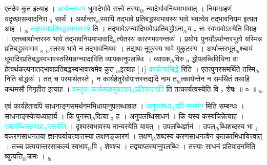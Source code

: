 \documentclass[article,12pt,a4paper]{memoir}%
\newcommand{\quotelemma}[1]{\textcolor{cyan}{#1}}
\newcounter{parCount}
\begin{document}
	  
	  \pstart \leavevmode%
	\hphantom{.}एतदेव कुत इत्याह । \quotelemma{अर्थान्तरस्य} \cite[2a7]{vn-msN} धूमादेर्भावे सत्त्वे तस्या{\tiny $_{lb}$} \leavevmode{} न्यादेर्भावनियमाभावात् । नियमग्रहणं यदृच्छासम्वादनिरा {\tiny $_{6}$} सार्थं । अर्थान्तर{\tiny $_{lb}$}स्यापि तद्भावे प्रतिबद्धस्वभावस्य भावे भवत्येव तद्भावनियम इत्यत आह । {\tiny $_{lb}$} \quotelemma{तद्भावाप्रतिबद्धस्वभावस्ये} \cite[2a7]{vn-msN} ति । तद्भावेऽग्न्यादिभावेऽप्रतिबद्धोऽना{\tiny $_{lb}$}य {\tiny $_{7}$} त्तः स्वभावोऽस्येति विग्रहः । एतच्चार्थान्तरस्य भावे तद्भावनियमाभावादि{\tiny $_{lb}$}त्येतस्य कारणमवगन्तव्यं । प्रयोगः पुनर्योऽर्थान्तरभूतो यस्मिन्न प्रतिबद्धस्वभाव {\tiny $_{8}$} {\tiny $_{lb}$}स्तस्य भावे न तद्भावनियमः । तद्यथा नूपुरस्य भावे मुकुटस्य । अर्थान्तरभूत{\tiny $_{lb}$}श्चायं धूमादिरप्रतिबद्धस्वभावस्तस्मिन्नग्न्यादाविति व्यापकानुपलब्धिः । व्यापक{\tiny $_{lb}$}विरु {\tiny $_{9}$} \leavevmode{} द्धोपलब्धिविधिना वा हेत्वर्थकल्पनातद्भावाप्रतिबद्धस्वभावत्त्वमेव कुत {\tiny $_{lb}$}इत्याह [।] \quotelemma{कार्यत्त्वासिद्धे} \cite[2a7]{vn-msN} रिति । एतत्पुनरसमर्थिते तस्मि{\tiny $_{lb}$}निति बोद्धव्यं । तत् च परमार्थतस्ते {\tiny $_{1}$} न कार्यहेतुरेवोपात्तस्त्तद्यदि नाम त{\tiny $_{lb}$}त्कार्यन्तेन न समर्थितं तथाहि कथमसौ निगृहीत इत्याह । \quotelemma{वस्तुतः कार्यस्याप्युपादान{\tiny $_{lb}$}प्रतिपादनादि} \cite[2a8]{vn-msN} ति तत्कार्यत्वस्येति वि {\tiny $_{2}$} शेषः ॥ ० ॥
	{}
	\pend%
      {\tiny $_{lb}$}

	  
	  \pstart \leavevmode%
	\hphantom{.}एवं कार्यहेतावपि साधनाङ्गसमर्थनमभिधायानुपलब्धावाह । \quotelemma{अनुपलब्धा{\tiny $_{lb}$}वपि समर्थन} \cite[2a8]{vn-msN} मिति सम्बन्धः । साधनाङ्स्येत्यध्याहार्य । किं पुनस्त{\tiny $_{lb}$}दित्या {\tiny $_{3}$} ह । अनुपलब्धिसाधनं । किं यस्य कस्यचिन्नेत्याह । \quotelemma{उपलब्धिलक्षणप्रा{\tiny $_{lb}$}प्तस्येति} \cite[2a8]{vn-msN} । दृश्यस्वभावस्य नान्यस्येति यावत् । उपलब्धिर्ज्ञानं । उपल{\tiny $_{lb}$}ब्धिशब्दस्य भा {\tiny $_{4}$} वकरणसाधनतया ज्ञानपर्यायत्त्वात्तस्या लक्षणङ्कारणं । लक्षण{\tiny $_{lb}$}शब्दस्य करणसाधनत्वेन कृतकाभिधायित्त्वात् । तच्च प्रत्ययान्तरसाकल्यं स्वभाव{\tiny $_{lb}$}वि {\tiny $_{5}$} शेषश्च । तद्व्याप्तस्यानुपलब्धिः । तस्याः साधनं प्रतिपादनमिति व्युत्पत्ति{\tiny $_{lb}$}क्रमः ।
	{}
	\pend%
      {\tiny $_{lb}$}
\end{document}
